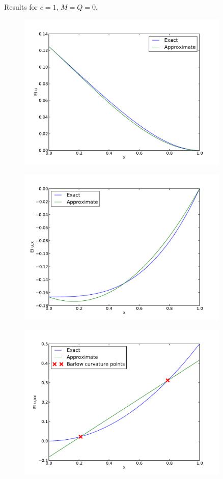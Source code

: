 \documentclass[12pt]{article}
\begin{document}
Results for $c=1$, $M=Q=0$.
\begin{figure}[h!]
\centering
\includegraphics[width=0.9\textwidth]{u.pdf}
\end{figure}
\begin{figure}[h!]
\centering
\includegraphics[width=0.9\textwidth]{ux.pdf}
\end{figure}
\begin{figure}[h!]
\centering
\includegraphics[width=0.9\textwidth]{uxx.pdf}
\end{figure}
\end{document}
